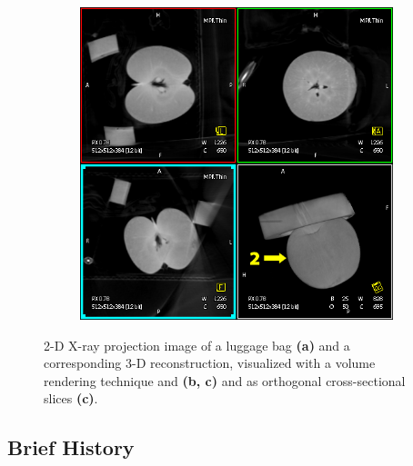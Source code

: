 \begin{frame}
\begin{figure}[tb]
\begin{subfigure}[t]{0.29\linewidth}
			\caption{}
			\label{fig:ct_mot_1.2}
		\end{subfigure}
		\begin{subfigure}[t]{0.29\linewidth}
			\includegraphics[width=\linewidth]{images/box_apple}
			\caption{}
			\label{fig:ct_mot_1.3}
		\end{subfigure}
		\caption{2-D X-ray projection image of a luggage bag \textbf{(a)} and a corresponding 3-D reconstruction, visualized with a volume rendering technique and \textbf{(b, c)} and as orthogonal cross-sectional slices \textbf{(c)}.}
		\label{fig:ct_mot_1}
	\end{figure}

\end{frame}


\subsection{Brief History}
\label{sub:ct_hist}

